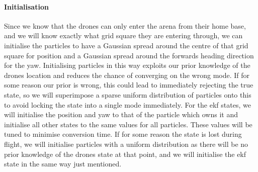 \documentclass{report_template_oxford}
\begin{document}
\paragraph{Initialisation} Since we know that the drones can only enter the arena from their home base, and we will know exactly what grid square they are entering through, we can initialise the particles to have a Gaussian spread around the centre of that grid square for position and a Gaussian spread around the forwards heading direction for the yaw. Initialising particles in this way exploits our prior knowledge of the drones location and reduces the chance of converging on the wrong mode. If for some reason our prior is wrong, this could lead to immediately rejecting the true state, so we will superimpose a sparse uniform distribution of particles onto this to avoid locking the state into a single mode immediately. For the \gls{ekf} states, we will initialise the position and yaw to that of the particle which owns it and initialise all other states to the same values for all particles. These values will be tuned to minimise conversion time. If for some reason the state is lost during flight, we will initialise particles with a uniform distribution as there will be no prior knowledge of the drones state at that point, and we will initialise the \gls{ekf} state in the same way just mentioned.
\end{document}
